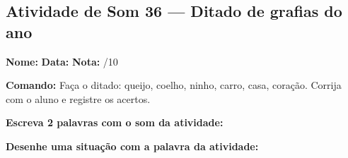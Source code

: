 \subsection{Atividade de Som 36 --- Ditado de grafias do ano}
\begin{exercicio}



\noindent\textbf{Nome:} \underline{\hspace{3.2cm}} \quad \textbf{Data:} \underline{\hspace{1.6cm}} \quad \textbf{Nota:} \underline{\hspace{0.9cm}}/10


\noindent\textbf{Comando:} Faça o ditado: queijo, coelho, ninho, carro, casa, coração. Corrija com o aluno e registre os acertos.


\begin{center}
\end{center}

\noindent\textbf{Escreva 2 palavras com o som da atividade:}

\begin{center}
  \underline{\hspace{3cm}} \quad \underline{\hspace{3cm}}
\end{center}

\noindent\textbf{Desenhe uma situação com a palavra da atividade:}

\begin{center}
\end{center}

\end{exercicio}



